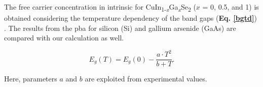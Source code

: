 \documentclass[a4paper, 12pt, titlepage,oneside,drop]{kthesis}
\begin{document}
The free carrier concentration in intrinsic for {CuIn\textsubscript{1-\textit{x}}Ga\textsubscript{\textit{x}}Se\textsubscript{2}} ($x$ = 0, 0.5, and 1) is obtained considering the temperature dependency of the band gaps 
(\textbf{Eq. \ref{bgtd}}) \cite{hellwege1967landolt}.
The results from the pba for silicon (Si) and gallium arsenide (GaAs) are compared with our calculation as well.

\begin{equation}\label{bgtd}
 E_g(T) = E_g(0) - \frac{a \cdot T^2}{b+T}.
\end{equation}

Here, parameters $a$ and $b$ are exploited from experimental values.

\begin{table}[H]
\centering
 \captionsetup{width=1\textwidth}
\caption {Parameters of $a$ and $b$ in \textbf{Eq. \ref{bgtd}}}\label{chen2}
\end{table}
\end{document}
